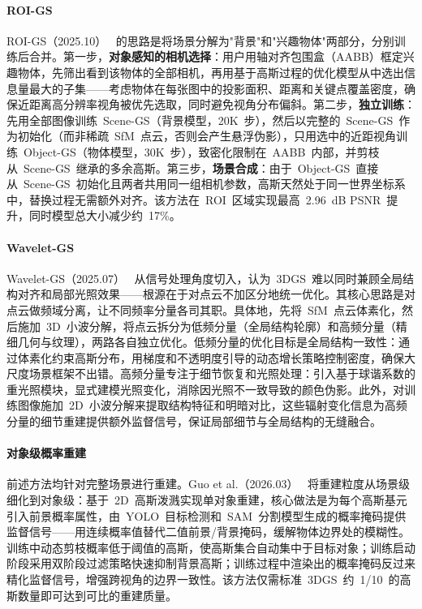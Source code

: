 \paragraph{ROI-GS}
ROI-GS（2025.10）~\cite{2510_01978} 的思路是将场景分解为"背景"和"兴趣物体"两部分，分别训练后合并。第一步，\textbf{对象感知的相机选择}：用户用轴对齐包围盒（AABB）框定兴趣物体，先筛出看到该物体的全部相机，再用基于高斯过程的优化模型从中选出信息量最大的子集——考虑物体在每张图中的投影面积、距离和关键点覆盖密度，确保近距离高分辨率视角被优先选取，同时避免视角分布偏斜。第二步，\textbf{独立训练}：先用全部图像训练~Scene-GS（背景模型，20K~步），然后以完整的~Scene-GS~作为初始化（而非稀疏~SfM~点云，否则会产生悬浮伪影），只用选中的近距视角训练~Object-GS（物体模型，30K~步），致密化限制在~AABB~内部，并剪枝从~Scene-GS~继承的多余高斯。第三步，\textbf{场景合成}：由于~Object-GS~直接从~Scene-GS~初始化且两者共用同一组相机参数，高斯天然处于同一世界坐标系中，替换过程无需额外对齐。该方法在~ROI~区域实现最高~2.96~dB PSNR~提升，同时模型总大小减少约~17\%。

\paragraph{Wavelet-GS}
Wavelet-GS（2025.07）~\cite{2507_12498} 从信号处理角度切入，认为~3DGS~难以同时兼顾全局结构对齐和局部光照效果——根源在于对点云不加区分地统一优化。其核心思路是对点云做频域分离，让不同频率分量各司其职。具体地，先将~SfM~点云体素化，然后施加~3D~小波分解，将点云拆分为低频分量（全局结构轮廓）和高频分量（精细几何与纹理），两路各自独立优化。低频分量的优化目标是全局结构一致性：通过体素化约束高斯分布，用梯度和不透明度引导的动态增长策略控制密度，确保大尺度场景框架不出错。高频分量专注于细节恢复和光照处理：引入基于球谐系数的重光照模块，显式建模光照变化，消除因光照不一致导致的颜色伪影。此外，对训练图像施加~2D~小波分解来提取结构特征和明暗对比，这些辐射变化信息为高频分量的细节重建提供额外监督信号，保证局部细节与全局结构的无缝融合。

\paragraph{对象级概率重建}
前述方法均针对完整场景进行重建。Guo et al.（2026.03）~\cite{2603_14316} 将重建粒度从场景级细化到对象级：基于~2D~高斯泼溅实现单对象重建，核心做法是为每个高斯基元引入前景概率属性，由~YOLO~目标检测和~SAM~分割模型生成的概率掩码提供监督信号——用连续概率值替代二值前景/背景掩码，缓解物体边界处的模糊性。训练中动态剪枝概率低于阈值的高斯，使高斯集合自动集中于目标对象；训练启动阶段采用双阶段过滤策略快速抑制背景高斯；训练过程中渲染出的概率掩码反过来精化监督信号，增强跨视角的边界一致性。该方法仅需标准~3DGS~约~1/10~的高斯数量即可达到可比的重建质量。

